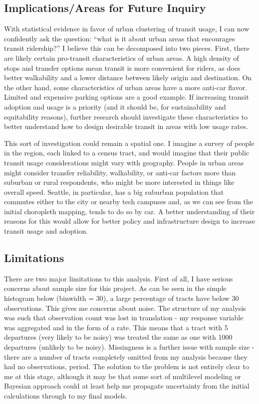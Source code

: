 \documentclass[
]{article}
\begin{document}
\subsection{Implications/Areas for Future
Inquiry}\label{implicationsareas-for-future-inquiry}

With statistical evidence in favor of urban clustering of transit usage,
I can now confidently ask the question: ``what is it about urban areas
that encourages transit ridership?'' I believe this can be decomposed
into two pieces. First, there are likely certain pro-transit
characteristics of urban areas. A high density of stops and transfer
options mean transit is more convenient for riders, as does better
walkability and a lower distance between likely origin and destination.
On the other hand, some characteristics of urban areas have a more
anti-car flavor. Limited and expensive parking options are a good
example. If increasing transit adoption and usage is a priority (and it
should be, for sustainability and equitability reasons), further
research should investigate these characteristics to better understand
how to design desirable transit in areas with low usage rates.

This sort of investigation could remain a spatial one. I imagine a
survey of people in the region, each linked to a census tract, and would
imagine that their public transit usage considerations might vary with
geography. People in urban areas might consider transfer reliability,
walkability, or anti-car factors more than suburban or rural
respondents, who might be more interested in things like overall speed.
Seattle, in particular, has a big suburban population that commutes
either to the city or nearby tech campuses and, as we can see from the
initial choropleth mapping, tends to do so by car. A better
understanding of their reasons for this would allow for better policy
and infrastructure design to increase transit usage and adoption.

\subsection{Limitations}\label{limitations}

There are two major limitations to this analysis. First of all, I have
serious concerns about sample size for this project. As can be seen in
the simple histogram below (binwidth = 30), a large percentage of tracts
have below 30 observations. This gives me concerns about noise. The
structure of my analysis was such that observation count was lost in
translation - my response variable was aggregated and in the form of a
rate. This means that a tract with 5 departures (very likely to be
noisy) was treated the same as one with 1000 departures (unlikely to be
noisy). Missingness is a further issue with sample size - there are a
number of tracts completely omitted from my analysis because they had no
observations, period. The solution to the problem is not entirely clear
to me at this stage, although it may be that some sort of multilevel
modeling or Bayesian approach could at least help me propagate
uncertainty from the initial calculations through to my final models.
\end{document}
